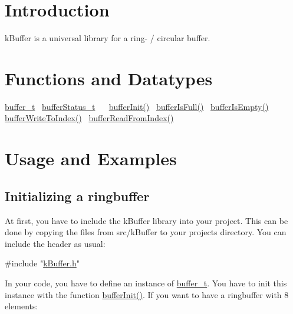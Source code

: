\hypertarget{index_intro}{}\section{Introduction}\label{index_intro}
k\+Buffer is a universal library for a ring-\/ / circular buffer. \hypertarget{index_function}{}\section{Functions and Datatypes}\label{index_function}
\hyperlink{structbuffer__t}{buffer\+\_\+t}~\newline
 \hyperlink{k_buffer_8h_a7a0bf550b7bd49d85172e409c0034fe6}{buffer\+Status\+\_\+t}~\newline
 ~\newline
 \hyperlink{k_buffer_8c_aec18d6ea571b1326dbeb7ca15f4969c0}{buffer\+Init()}~\newline
 \hyperlink{k_buffer_8c_ac69b8a12a33d0cf0a5dab8feb4f7b020}{buffer\+Is\+Full()}~\newline
 \hyperlink{k_buffer_8c_a5c599b9386c73ccd7b5eeb25f6cca38e}{buffer\+Is\+Empty()}~\newline
 \hyperlink{k_buffer_8c_a8508583be1e356a243b0ce67254c516e}{buffer\+Write\+To\+Index()}~\newline
 \hyperlink{k_buffer_8c_aa0d7e2a4b6fd3da2822d7f968be74e5c}{buffer\+Read\+From\+Index()}~\newline
 \hypertarget{index_usage}{}\section{Usage and Examples}\label{index_usage}
\hypertarget{index_init}{}\subsection{Initializing a ringbuffer}\label{index_init}
At first, you have to include the k\+Buffer library into your project. This can be done by copying the files from src/k\+Buffer to your project\textquotesingle{}s directory. You can include the header as usual\+: 
\begin{DoxyCode}
\textcolor{preprocessor}{#include "\hyperlink{k_buffer_8h}{kBuffer.h}"}
\end{DoxyCode}
 In your code, you have to define an instance of \hyperlink{structbuffer__t}{buffer\+\_\+t}. You have to init this instance with the function \hyperlink{k_buffer_8c_aec18d6ea571b1326dbeb7ca15f4969c0}{buffer\+Init()}. If you want to have a ringbuffer with 8 elements\+: 

